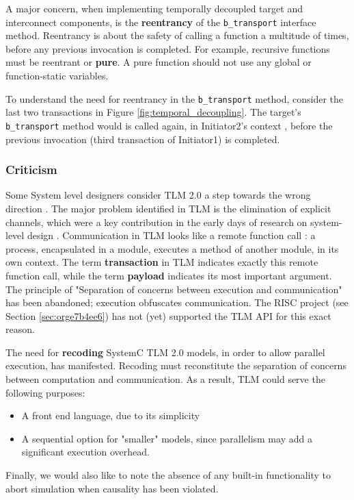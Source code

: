 \documentclass[11pt]{article}
\begin{document}
A major concern, when implementing temporally decoupled target and interconnect components, is the \textbf{reentrancy} of the \texttt{b\_transport} interface method.
Reentrancy is about the safety of calling a function a multitude of times, before any previous invocation is completed.
For example, recursive functions must be reentrant or \textbf{pure}.
A pure function should not use any global or function-static variables.

To understand the need for reentrancy in the \texttt{b\_transport} method, consider the last two transactions in Figure \ref{fig:temporal_decoupling}.
The target's \texttt{b\_transport} method would is called again, in Initiator2's context , before the previous invocation (third transaction of Initiator1) is completed.

\subsubsection{Criticism}
\label{sec:org77b6859}
Some System level designers consider TLM 2.0 a step towards the wrong direction \cite{Liu2015}.
The major problem identified in TLM is the elimination of explicit channels, which were a key contribution in the early days of research on system-level design \cite{Liu2015}.
Communication in TLM looks like a remote function call \cite{Ecker2009}: a process, encapsulated in a module, executes a method of another module, in its own context.
The term \textbf{transaction} in TLM indicates exactly this remote function call, while the term \textbf{payload} indicates its most important argument.
The principle of "Separation of concerns between execution and communication" has been abandoned; execution obfuscates communication.
The RISC project (see Section \ref{sec:orge7b4ee6}) has not (yet) supported the TLM API for this exact reason.

The need for \textbf{recoding} SystemC TLM 2.0 models, in order to allow parallel execution, has manifested. 
Recoding must reconstitute the separation of concerns between computation and communication.
As a result, TLM could serve the following purposes:
\begin{itemize}
\item A front end language, due to its simplicity
\item A sequential option for "smaller" models, since parallelism may add a significant execution overhead.
\end{itemize}

Finally, we would also like to note the absence of any built-in functionality to abort simulation when causality has been violated.
\clearpage
\end{document}

